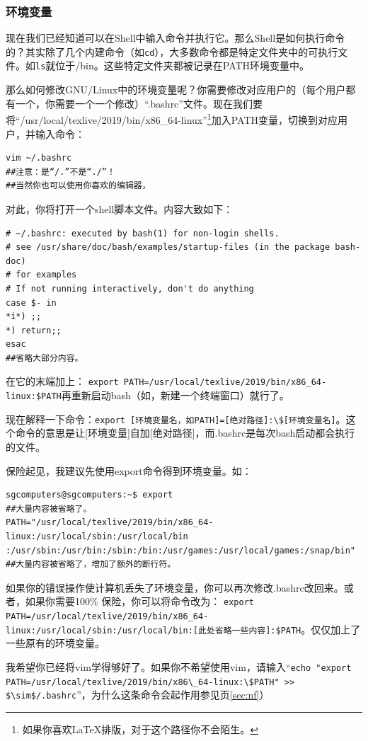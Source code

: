 \subsubsection{环境变量}
现在我们已经知道可以在Shell中输入命令并执行它。那么Shell是如何执行命令的？其实除了几个内建命令（如\verb|cd|），大多数命令都是特定文件夹中的可执行文件。如\verb|ls|就位于/bin。这些特定文件夹都被记录在PATH环境变量中。\par
那么如何修改GNU/Linux中的环境变量呢？你需要修改对应用户的（每个用户都有一个，你需要一个一个修改）“.bashrc”文件。现在我们要将“/usr/local/texlive/2019/bin/x86\_64-linux”\footnote{如果你喜欢\LaTeX 排版，对于这个路径你不会陌生。}加入PATH变量，切换到对应用户，并输入命令：
\begin{verbatim}
vim ~/.bashrc
##注意：是“/.”不是“./”！
##当然你也可以使用你喜欢的编辑器，
\end{verbatim} \par
对此，你将打开一个shell脚本文件。内容大致如下：
\begin{verbatim}
# ~/.bashrc: executed by bash(1) for non-login shells.
# see /usr/share/doc/bash/examples/startup-files (in the package bash-doc)
# for examples
# If not running interactively, don't do anything
case $- in
*i*) ;;
*) return;;
esac
##省略大部分内容。
\end{verbatim} \par
在它的末端加上：
\verb|export PATH=/usr/local/texlive/2019/bin/x86_64-linux:$PATH|再重新启动bash（如，新建一个终端窗口）就行了。\par
现在解释一下命令：\verb|export [环境变量名，如PATH]=[绝对路径]:\$[环境变量名]|。这个命令的意思是让[环境变量]自加[绝对路径]，而.bashrc是每次bash启动都会执行的文件。\par
保险起见，我建议先使用export命令得到环境变量。如：
\begin{verbatim}
sgcomputers@sgcomputers:~$ export
##大量内容被省略了。
PATH="/usr/local/texlive/2019/bin/x86_64-linux:/usr/local/sbin:/usr/local/bin
:/usr/sbin:/usr/bin:/sbin:/bin:/usr/games:/usr/local/games:/snap/bin"
##大量内容被省略了，增加了额外的断行符。
\end{verbatim} \par
如果你的错误操作使计算机丢失了环境变量，你可以再次修改.bashrc改回来。或者，如果你需要100\% 保险，你可以将命令改为：
\verb|export PATH=/usr/local/texlive/2019/bin/x86_64-linux:/usr/local/sbin:/usr/local/bin:[此处省略一些内容]:$PATH|。仅仅加上了一些原有的环境变量。\par
我希望你已经将vim学得够好了。如果你不希望使用vim，请输入“\verb|echo "export PATH=/usr/local/texlive/2019/bin/x86\_64-linux:\$PATH" >> $\sim$/.bashrc|”，为什么这条命令会起作用参见\pageref{sec:nf}页\ref{sec:nf}）
